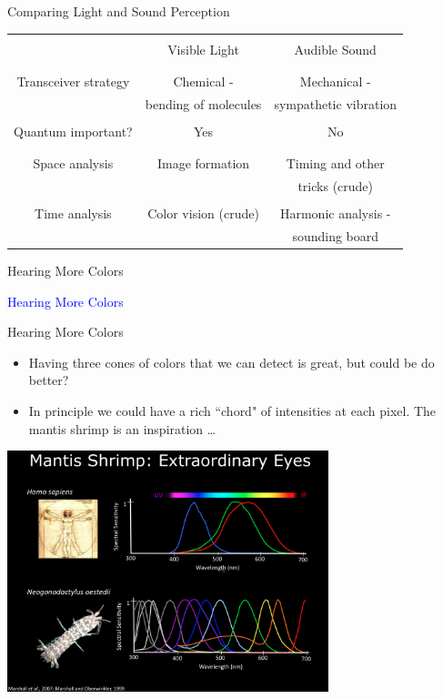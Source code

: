 \documentclass{beamer}
\begin{document}
\begin{frame}{Comparing Light and Sound Perception}
   \begin{center}
      \begin{tabular}{|c|c|c|}
         \hline
         & & \\
         & Visible Light & Audible Sound \\
         & & \\ \hline
         & & \\
         Transceiver strategy & Chemical - & Mechanical - \\
         & bending of molecules & sympathetic vibration \\ \hline
         & & \\
         Quantum important? & Yes & No \\
         & & \\ \hline
         & & \\
         Space analysis & Image formation & Timing and other \\
         & & tricks (crude) \\ \hline
         & & \\
         Time analysis & Color vision (crude) & Harmonic analysis - \\
         & & sounding board \\ \hline
      \end{tabular}
   \end{center}
\end{frame}

\begin{frame}{Hearing More Colors}
   \begin{center}
      \Huge \textcolor{blue}{Hearing More Colors}
   \end{center}
\end{frame}

\begin{frame}{Hearing More Colors}
   \begin{itemize}
      \item Having three cones of colors that we can detect is great, but could be do better?
      \item In principle we could have a rich ``chord" of intensities at each pixel. The mantis shrimp is an inspiration \ldots
   \end{itemize}
   \begin{center}
      \includegraphics[width=0.7\textwidth]{figures/mantisshrimp.jpg}
   \end{center}
\end{frame}
\end{document}
